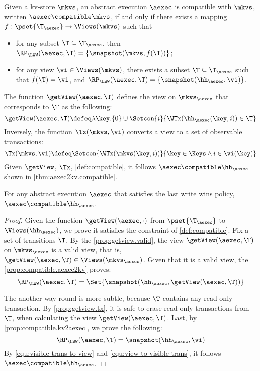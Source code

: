 \begin{definition}
\label{def:compatible}
Given a kv-store $\mkvs$,
an abstract execution $\aexec$ is compatible with $\mkvs$, written 
$\aexec \compatible \mkvs$, if and only if there exists a  mapping 
$f: \pset{\T_{\aexec}} \rightarrow \Views(\mkvs)$
such that  
\begin{itemize}
\item for any subset $\T \subseteq \T_{\aexec}$, then $\RP_{\LWW}(\aexec, \T) = \{\snapshot(\mkvs, f(\T))\}$; 
\item for any view $\vi \in \Views(\mkvs)$, there exists a subset $\T \subseteq \T_{\aexec}$ 
such that $f(\T) = \vi$, and $\RP_{\LWW}(\aexec, \T) = \{\snapshot(\hh_{\aexec}, \vi)\}$.
\end{itemize}
\end{definition}

The function $\getView(\aexec, \T)$ defines the view on \( \mkvs_\aexec \) that corresponds to \( \T \) as the following:
\[
    \getView(\aexec, \T) \defeq \lambda \key. \{0\} \cup \Setcon{ i }{\WTx(\hh_{\aexec}(\key, i)) \in \T}
\]
Inversely, the function \( \Tx(\mkvs, \vi) \) converts a view to a set of observable transactions:
\[
\Tx(\mkvs, \vi) \defeq \Setcon{ \WTx(\mkvs(\key, i)) }{ \key \in \Keys \wedge i \in \vi(\key) }
\]
Given \( \getView \), \( \Tx \), \cref{def:compatible}, 
it follows \( \aexec \compatible \hh_{\aexec} \) shown in \cref{thm:aexec2kv.compatible}.

\begin{theorem}
\label{thm:aexec2kv.compatible}
For any abstract execution $\aexec$ that satisfies the last write wins policy, $\aexec \compatible \hh_{\aexec}$.
\end{theorem}
\begin{proof}
Given the function $\getView(\aexec, \cdot )$ from $\pset{\T_{\aexec}}$ to $\Views(\hh_{\aexec})$,
we prove it satisfies the constraint of \cref{def:compatible}.
Fix a set of transitions \( \T \).
By the \cref{prop:getview.valid}, the view $\getView(\aexec, \T )$  on \( \mkvs_\aexec \) is a valid view,
that is, \( \getView(\aexec, \T ) \in \Views(\mkvs_\aexec) \).
Given that it is a valid view, the \cref{prop:compatible.aexec2kv} proves:
\begin{equation}
    \label{equ:visible-trans-to-view}
    \RP_{\LWW}(\aexec, \T) = \Set{\snapshot(\hh_{\aexec}, \getView(\aexec, \T))} 
\end{equation}

The another way round is more subtle,
because \( \T \) contains any read only transaction.
By \cref{prop:getview.tx}, it is safe to erase read only transactions from \( \T \),
when calculating the view \( \getView(\aexec, \T ) \).
Last, by \cref{prop:compatible.kv2aexec}, we prove the following:
\begin{equation}
    \label{equ:view-to-visible-trans}
    \RP_{\LWW}(\aexec, \T) = \snapshot(\hh_{\aexec}, \vi)
\end{equation}
By \cref{equ:visible-trans-to-view} and \cref{equ:view-to-visible-trans},
it follows \( \aexec \compatible \hh_{\aexec} \).
\end{proof}

